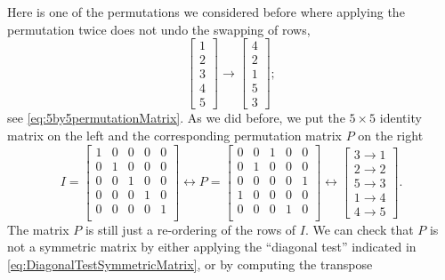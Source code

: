 Here is one of the permutations we considered before where applying the permutation twice does not undo the swapping of rows,
\begin{equation}
\label{eq:PermuationRevisted}
     \left[\begin{array}{r} 1 \\2 \\3 \\ 4 \\ 5\end{array} \right] \rightarrow \left[\begin{array}{r} 4 \\2 \\1 \\ 5 \\ 3\end{array} \right];
\end{equation}
see \eqref{eq:5by5permutationMatrix}. As we did before, we put the $5 \times 5$ identity matrix on the left and the corresponding permutation matrix $P$ on the right
\begin{equation}
\label{eq:PermuationRevisted02}
I=\begin{bmatrix}
1&0&0&0&0\\
0&1&0&0&0\\
0&0&1&0&0\\
0&0&0&1&0\\
0&0&0&0&1\\
\end{bmatrix} \leftrightarrow
P=\begin{bmatrix}
0&0&1&0&0\\ %
0&1&0&0&0\\ %
0&0&0&0&1\\ %
1&0&0&0&0\\ %
0&0&0&1&0\\ %
\end{bmatrix} \leftrightarrow \left[\begin{array}{r} 3 \rightarrow 1 \\2 \rightarrow 2 \\5 \rightarrow 3 \\ 1 \rightarrow 4 \\ 4 \rightarrow 5\end{array} \right].
\end{equation}
The matrix $P$ is still just a re-ordering of the rows of $I$. We can check that $P$ is not a symmetric matrix by either applying the ``diagonal test'' indicated in \eqref{eq:DiagonalTestSymmetricMatrix}, or by computing the transpose 
